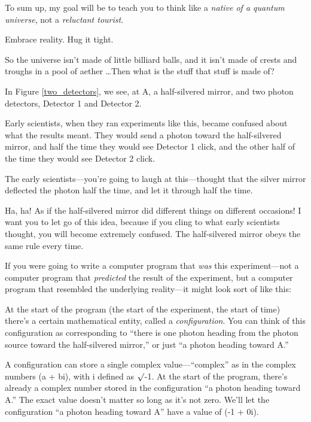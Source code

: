 {
 To sum up, my goal will be to teach you to think like a
\textit{native of a quantum universe}, not a \textit{reluctant
tourist}.}

{
 Embrace reality. Hug it tight.}

\myendsectiontext


{
 So the universe isn't made of little billiard
balls, and it isn't made of crests and troughs in a
pool of aether \ldots Then what is the stuff that stuff is made of?}


{
 In Figure \ref{two_detectors}, we see, at A, a half-silvered mirror, and two
photon detectors, Detector 1 and Detector 2.}

{
 Early scientists, when they ran experiments like this, became
confused about what the results meant. They would send a photon toward
the half-silvered mirror, and half the time they would see Detector 1
click, and the other half of the time they would see Detector 2 click.}

{
 The early scientists---you're going to laugh at
this---thought that the silver mirror deflected the photon half the
time, and let it through half the time.}

{
 Ha, ha! As if the half-silvered mirror did different things on
different occasions! I want you to let go of this idea, because if you
cling to what early scientists thought, you will become extremely
confused. The half-silvered mirror obeys the same rule every time.}

{
 If you were going to write a computer program that \textit{was}
this experiment---not a computer program that \textit{predicted} the
result of the experiment, but a computer program that resembled the
underlying reality---it might look sort of like this:}

{
 At the start of the program (the start of the experiment, the
start of time) there's a certain mathematical entity,
called a \textit{configuration}. You can think of this configuration as
corresponding to ``there is one photon heading from
the photon source toward the half-silvered mirror,''
or just ``a photon heading toward
A.''}

{
 A configuration can store a single complex
value---``complex'' as in the
complex numbers (a + bi), with i defined as ${\surd}$-1. At the start
of the program, there's already a complex number stored
in the configuration ``a photon heading toward
A.'' The exact value doesn't matter
so long as it's not zero. We'll let the
configuration ``a photon heading toward
A'' have a value of (-1 + 0i).}

